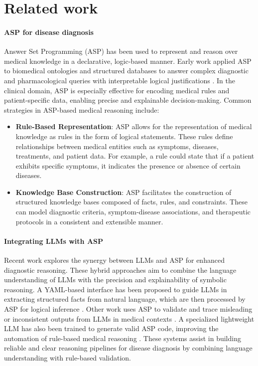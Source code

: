 \documentclass[10pt,leqno]{amsart}
\begin{document}
\section{Related work}
\paragraph{\textbf{ASP for disease diagnosis}}
Answer Set Programming (ASP) has been used to represent 
and reason over medical knowledge in a declarative, logic-based manner. 
Early work applied ASP to biomedical ontologies and structured databases 
to answer complex diagnostic and pharmacological queries with interpretable 
logical justifications \cite{Erdem2011}. In the clinical domain, 
ASP is especially effective for encoding medical rules and patient-specific data, 
enabling precise and explainable decision-making.
Common strategies in ASP-based medical reasoning include:

\begin{itemize}
    \item \textbf{Rule-Based Representation}: ASP allows for the representation of medical 
    knowledge as rules in the form of logical statements. 
    These rules define relationships between medical entities such as symptoms, 
    diseases, treatments, and patient data. For example, a rule could state that 
    if a patient exhibits specific symptoms, it indicates the presence or absence 
    of certain diseases.
    \item \textbf{Knowledge Base Construction}: ASP facilitates the construction of 
    structured knowledge bases composed of facts, rules, and constraints. These can 
    model diagnostic criteria, symptom-disease associations, and therapeutic protocols 
    in a consistent and extensible manner.
\end{itemize}

\paragraph{\textbf{Integrating LLMs with ASP}}

Recent work explores the synergy between LLMs and ASP 
for enhanced diagnostic reasoning. 
These hybrid approaches aim to combine the language understanding of LLMs 
with the precision and explainability of symbolic reasoning. 
A YAML-based interface has been proposed to guide LLMs 
in extracting structured facts from natural language, 
which are then processed by ASP for logical inference \cite{alviano2024llm2asp}. 
Other work uses ASP to validate and trace misleading or inconsistent outputs 
from LLMs in medical contexts \cite{Nguyen2025}. 
A specialized lightweight LLM has also been trained to generate valid ASP code, 
improving the automation of rule-based medical reasoning \cite{coppolillo2024llasp}.
These systems assist in building reliable and clear reasoning pipelines 
for disease diagnosis by combining language understanding with rule-based validation.
\end{document}
